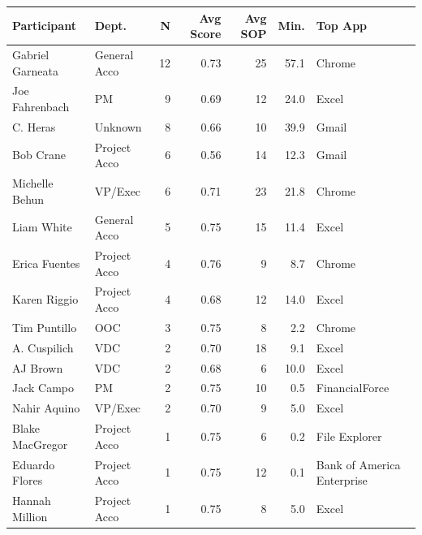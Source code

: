 \begin{tabular}{llrrrrl}
\toprule
\textbf{Participant} & \textbf{Dept.} & \textbf{N} & \textbf{Avg Score} & \textbf{Avg SOP} & \textbf{Min.} & \textbf{Top App} \\
\midrule
Gabriel Garneata & General Acco & 12 & 0.73 & 25 & 57.1 & Chrome \\
Joe Fahrenbach & PM & 9 & 0.69 & 12 & 24.0 & Excel \\
C. Heras & Unknown & 8 & 0.66 & 10 & 39.9 & Gmail \\
Bob Crane & Project Acco & 6 & 0.56 & 14 & 12.3 & Gmail \\
Michelle Behun & VP/Exec & 6 & 0.71 & 23 & 21.8 & Chrome \\
Liam White & General Acco & 5 & 0.75 & 15 & 11.4 & Excel \\
Erica Fuentes & Project Acco & 4 & 0.76 & 9 & 8.7 & Chrome \\
Karen Riggio & Project Acco & 4 & 0.68 & 12 & 14.0 & Excel \\
Tim Puntillo & OOC & 3 & 0.75 & 8 & 2.2 & Chrome \\
A. Cuspilich & VDC & 2 & 0.70 & 18 & 9.1 & Excel \\
AJ Brown & VDC & 2 & 0.68 & 6 & 10.0 & Excel \\
Jack Campo & PM & 2 & 0.75 & 10 & 0.5 & FinancialForce \\
Nahir Aquino & VP/Exec & 2 & 0.70 & 9 & 5.0 & Excel \\
Blake MacGregor & Project Acco & 1 & 0.75 & 6 & 0.2 & File Explorer \\
Eduardo Flores & Project Acco & 1 & 0.75 & 12 & 0.1 & Bank of America Enterprise \\
Hannah Million & Project Acco & 1 & 0.75 & 8 & 5.0 & Excel \\
\bottomrule
\end{tabular}